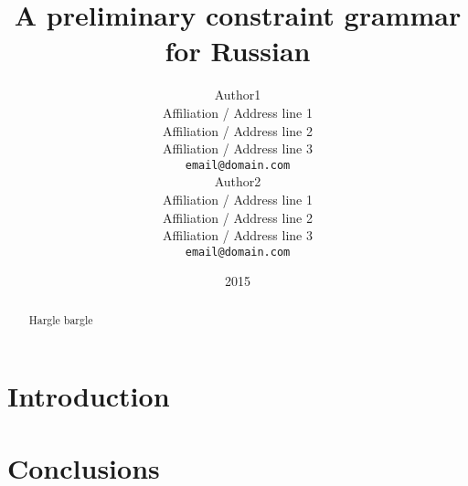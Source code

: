 \documentclass[11pt]{article}
\title{A preliminary constraint grammar for Russian}
\author{Author1 \\
  Affiliation / Address line 1 \\
  Affiliation / Address line 2 \\
  Affiliation / Address line 3 \\
  {\tt email@domain.com} \\\And
  Author2 \\
  Affiliation / Address line 1 \\
  Affiliation / Address line 2 \\
  Affiliation / Address line 3 \\
  {\tt email@domain.com} \\}
\date{2015}
\begin{document}
\maketitle
\begin{abstract}
  Hargle bargle
\end{abstract}

\section{Introduction}

\cite{Karlsson-90}

\section{Conclusions}

%



\end{document}
